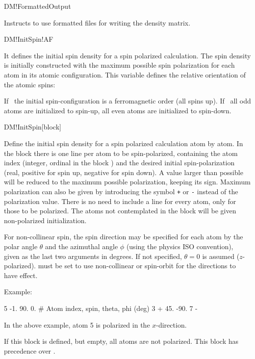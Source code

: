 \begin{fdflogicalF}{DM!FormattedOutput}

  Instructs to use formatted files for writing the density
  matrix.
  
\end{fdflogicalF}

\begin{fdflogicalF}{DM!InitSpin!AF}
  
  It defines the initial spin density for a spin polarized calculation.
  The spin density is initially constructed with the maximum possible
  spin polarization for each atom in its atomic configuration.
  This variable defines the relative orientation of the atomic
  spins:

  If \fdffalse\ the initial spin-configuration is a ferromagnetic
  order (all spins up).
  If \fdftrue\ all odd atoms are initialized to spin-up, all even
  atoms are initialized to spin-down.

\end{fdflogicalF}

\begin{fdfentry}{DM!InitSpin}[block]
  
  Define the initial spin density for a spin polarized calculation
  atom by atom. In the block there is one line per atom to be
  spin-polarized, containing the atom index (integer, ordinal in the
  block ) and the desired
  initial spin-polarization (real, positive for spin up, negative for
  spin down). A value larger than possible will be reduced to the
  maximum possible polarization, keeping its sign. Maximum
  polarization can also be given by introducing the symbol \texttt{+}
  or \texttt{-} instead of the polarization value. There is no need
  to include a line for every atom, only for those to be
  polarized. The atoms not contemplated in the block will be given
  non-polarized initialization. 

  For non-collinear spin, the spin direction may be specified for each
  atom by the polar angle $\theta$ and the azimuthal angle $\phi$
  (using the physics ISO convention), given as the last two arguments
  in degrees. If not specified, $\theta=0$ is assumed
  ($z$-polarized).  must be set to use non-collinear or
  spin-orbit for the directions to have effect.

  Example:
  \begin{fdfexample}
        5  -1.   90.   0.   # Atom index, spin, theta, phi (deg)
        3   +    45. -90.
        7   -
  \end{fdfexample}
  In the above example, atom 5 is polarized in the $x$-direction.

  If this block is defined, but empty, all atoms are not polarized.
  This block has precedence over .

\end{fdfentry}

